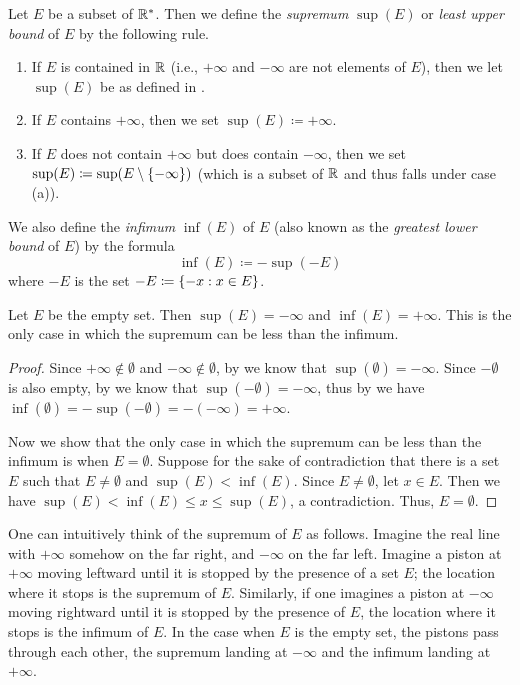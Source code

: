\begin{defn}\label{i:6.2.6}
  Let \(E\) be a subset of \(\mathbb{R}^*\).
  Then we define the \emph{supremum} \(\sup(E)\) or \emph{least upper bound} of \(E\) by the following rule.
  \begin{enumerate}
    \item If \(E\) is contained in \(\mathbb{R}\) (i.e., \(+\infty\) and \(-\infty\) are not elements of \(E\)), then we let \(\sup(E)\) be as defined in .
    \item If \(E\) contains \(+\infty\), then we set \(\sup(E) \coloneqq +\infty\).
    \item If \(E\) does not contain \(+\infty\) but does contain \(-\infty\), then we set \(\sup(E) \coloneqq \sup(E \setminus \left\lbrace-\infty\right\rbrace)\)
          (which is a subset of \(\mathbb{R}\) and thus falls under case (a)).
  \end{enumerate}
  We also define the \emph{infimum} \(\inf(E)\) of \(E\) (also known as the \emph{greatest lower bound} of \(E\)) by the formula
  \[
    \inf(E) \coloneqq -\sup(-E)
  \]
  where \(-E\) is the set \(-E \coloneqq \left\lbrace-x : x \in E\right\rbrace\).
\end{defn}

\setcounter{thm}{9}
\begin{eg}\label{i:6.2.10}
  Let \(E\) be the empty set.
  Then \(\sup(E) = -\infty\) and \(\inf(E) = +\infty\).
  This is the only case in which the supremum can be less than the infimum.
\end{eg}

\begin{proof}
  Since \(+\infty \notin \emptyset\) and \(-\infty \notin \emptyset\), by  we know that \(\sup(\emptyset) = -\infty\).
  Since \(-\emptyset\) is also empty, by  we know that \(\sup(-\emptyset) = -\infty\), thus by  we have \(\inf(\emptyset) = -\sup(-\emptyset) = -(-\infty) = +\infty\).

  Now we show that the only case in which the supremum can be less than the infimum is when \(E = \emptyset\).
  Suppose for the sake of contradiction that there is a set \(E\) such that \(E \neq \emptyset\) and \(\sup(E) < \inf(E)\).
  Since \(E \neq \emptyset\), let \(x \in E\).
  Then we have \(\sup(E) < \inf(E) \leq x \leq \sup(E)\), a contradiction.
  Thus, \(E = \emptyset\).
\end{proof}

\begin{note}
  One can intuitively think of the supremum of \(E\) as follows.
  Imagine the real line with \(+\infty\) somehow on the far right, and \(-\infty\) on the far left.
  Imagine a piston at \(+\infty\) moving leftward until it is stopped by the presence of a set \(E\);
  the location where it stops is the supremum of \(E\).
  Similarly, if one imagines a piston at \(-\infty\) moving rightward until it is stopped by the presence of \(E\), the location where it stops is the infimum of \(E\).
  In the case when \(E\) is the empty set, the pistons pass through each other, the supremum landing at \(-\infty\) and the infimum landing at \(+\infty\).
\end{note}

